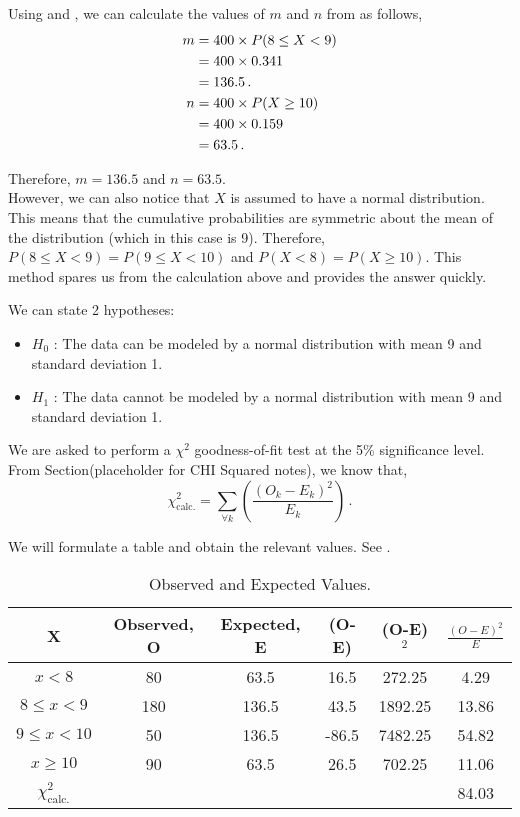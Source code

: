 \begin{subquestions}
\begin{subsubquestions}
Using  and , we can calculate the values of $m$ and $n$ from  as follows,
\begin{align}
	m & = 400 \times P(8 \leq X < 9) \nonumber \\
	  & = 400 \times 0.341 \nonumber \\
	  & = 136.5 \,. \\
    n & = 400 \times P(X \geq 10) \nonumber \\
      & = 400 \times 0.159 \nonumber \\
      & = 63.5 \,.
\end{align}

Therefore, $m=136.5$ and $n=63.5$. \\

However, we can also notice that $X$ is assumed to have a normal distribution. This means that the cumulative probabilities are symmetric about the mean of the distribution (which in this case is 9). Therefore, $P(8 \leq X < 9) = P(9 \leq X < 10)$ and $P(X < 8) = P(X \geq 10)$. This method spares us from the calculation above and provides the answer quickly.


\subsubquestion

We can state 2 hypotheses:
\begin{itemize}
	\item $H_0$ : The data can be modeled by a normal distribution with mean 9 and standard deviation 1.
	\item $H_1$ : The data cannot be modeled by a normal distribution with mean 9 and standard deviation 1.
\end{itemize}

We are asked to perform a $\chi^2$ goodness-of-fit test at the 5\% significance level. From Section(placeholder for CHI Squared notes), we know that,
\begin{equation}
	\chi^2_{\text{calc.}} = \sum_{\forall k} \left( \frac{(O_k-E_k)^2}{E_k}\right) \,.
\end{equation}

We will formulate a table and obtain the relevant values. See .
\begin{table}[H]
	\centering
	\begin{tabular}{|c|c|c|c|c|c|}
		\hline 
		X & Observed, O & Expected, E & (O-E) & (O-E)$^2$ & $\frac{(O-E)^2}{E}$ \\
		\hline
		$x<8$ & 80 & 63.5 & 16.5 & 272.25 & 4.29 \\
		$8 \leq x < 9$ & 180 & 136.5 & 43.5 & 1892.25 & 13.86 \\
		$9 \leq x < 10$ & 50 & 136.5 & -86.5 & 7482.25 & 54.82 \\
		$x \geq 10$ & 90 & 63.5 & 26.5 & 702.25 & 11.06 \\
		\hline
		$\chi^2_{\text{calc.}}$ & & & & & 84.03 \\
		\hline
	\end{tabular}
	\caption{\label{2015:q4:tab:Chi} Observed and Expected Values.}
\end{table}


\end{subsubquestions}
\end{subquestions}
